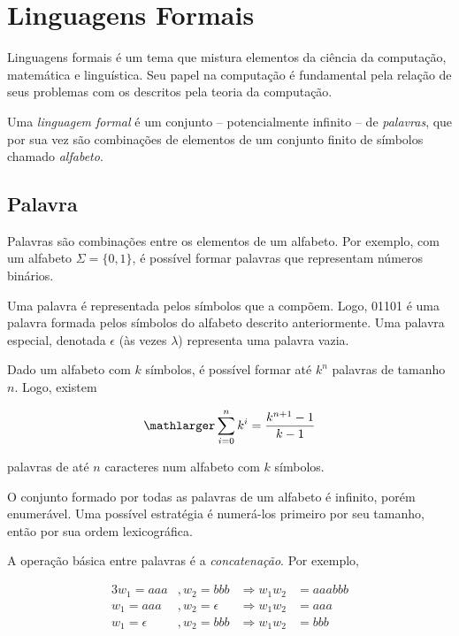 \documentclass[a4paper,12pt,oneside,onecolumn]{uerj}
\begin{document}
\section{Linguagens Formais}

Linguagens formais é um tema que mistura elementos da ciência da computação, matemática e linguística. Seu papel na computação é fundamental pela relação de seus problemas com os descritos pela teoria da computação.

Uma \emph{linguagem formal} é um conjunto -- potencialmente infinito -- de \emph{palavras}, que por sua vez são combinações de elementos de um conjunto finito de símbolos chamado \emph{alfabeto}.

\subsection{Palavra}

Palavras são combinações entre os elementos de um alfabeto. Por exemplo, com um alfabeto $\Sigma = \{0, 1\}$, é possível formar palavras que representam números binários.

Uma palavra é representada pelos símbolos que a compõem. Logo, 01101 é uma palavra formada pelos símbolos do alfabeto descrito anteriormente. Uma palavra especial, denotada $\epsilon$ (às vezes $\lambda$) representa uma palavra vazia.

Dado um alfabeto com $k$ símbolos, é possível formar até $k^n$ palavras de tamanho $n$. Logo, existem

\begin{equation*}
	\mathlarger \sum^{n}_{i=0} k^i = \frac{k^{n+1}-1}{k-1}
\end{equation*}

palavras de até $n$ caracteres num alfabeto com $k$ símbolos.

O conjunto formado por todas as palavras de um alfabeto é infinito, porém enumerável. Uma possível estratégia é numerá-los primeiro por seu tamanho, então por sua ordem lexicográfica.

A operação básica entre palavras é a \emph{concatenação}. Por exemplo, 

\begin{alignat*}{3}
w_1 = aaa &, w_2=bbb  &\Rightarrow w_1w_2 &= aaabbb \\
w_1 = aaa &, w_2=\epsilon  &\Rightarrow w_1w_2 &= aaa \\
w_1 = \epsilon &, w_2=bbb  &\Rightarrow w_1w_2 &= bbb \\
\end{alignat*}
\end{document}

